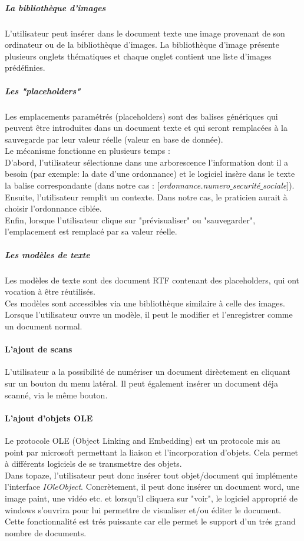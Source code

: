 \subparagraph*{La bibliothèque d'images}
L'utilisateur peut insérer dans le document texte une image provenant de son ordinateur ou de la bibliothèque d'images.
La bibliothèque d'image présente plusieurs onglets thématiques et chaque onglet contient une liste d'images prédéfinies.

\subparagraph*{Les "placeholders"}
Les emplacements paramétrés (placeholders) sont des balises génériques qui peuvent être introduites dans un document texte et qui seront remplacées à la sauvegarde par leur valeur réelle (valeur en base de donnée).\\

Le mécanisme fonctionne en plusieurs temps : \\
D'abord, l'utilisateur sélectionne dans une arborescence l'information dont il a besoin (par exemple: la date d'une ordonnance) et le logiciel insère dans le texte la balise correspondante (dans notre cas : \textit{$[$ordonnance.numero$\_$securité$\_$sociale$]$}). \\
Ensuite, l'utilisateur remplit un contexte. Dans notre cas, le praticien aurait à choisir l'ordonnance ciblée.\\
Enfin, lorsque l'utilisateur clique sur "prévisualiser" ou "sauvegarder", l'emplacement est remplacé par sa valeur réelle.

\subparagraph*{Les modèles de texte}
Les modèles de texte sont des document RTF contenant des placeholders, qui ont vocation à être réutilisés.\\
Ces modèles sont accessibles via une bibliothèque similaire à celle des images. 
Lorsque l'utilisateur ouvre un modèle, il peut le modifier et l'enregistrer comme un document normal. 

\paragraph*{L'ajout de scans \\}
L'utilisateur a la possibilité de numériser un document dirèctement en cliquant sur un bouton du menu latéral. Il peut également insérer un document déja scanné, via le même bouton.

\paragraph*{L'ajout d'objets OLE\\}
Le protocole OLE (Object Linking and Embedding) est un protocole mis au point par microsoft permettant la liaison et l'incorporation d'objets. Cela permet à différents logiciels de se transmettre des objets. \\
Dans topaze, l'utilisateur peut donc insérer tout objet/document qui implémente l'interface \textit{IOleObject}. Concrètement, il peut donc insérer un document word, une image paint, une vidéo etc. et lorsqu'il cliquera sur "voir", le logiciel approprié de windows s'ouvrira pour lui permettre de visualiser et/ou éditer le document.
Cette fonctionnalité est trés puissante car elle permet le support d'un trés grand nombre de documents. 

